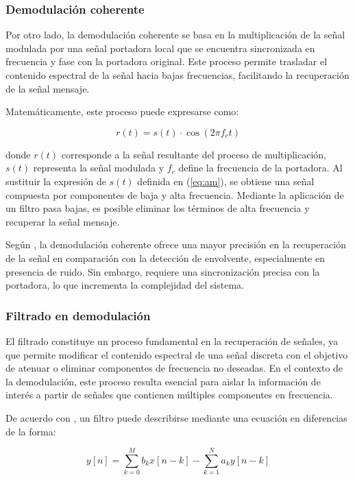 \subsubsection{Demodulación coherente}

Por otro lado, la demodulación coherente se basa en la multiplicación de la señal modulada por una señal portadora local que se encuentra sincronizada en frecuencia y fase con la portadora original. Este proceso permite trasladar el contenido espectral de la señal hacia bajas frecuencias, facilitando la recuperación de la señal mensaje.

Matemáticamente, este proceso puede expresarse como:

\begin{equation}
r(t) = s(t) \cdot \cos(2\pi f_c t)
\end{equation}

donde \( r(t) \) corresponde a la señal resultante del proceso de multiplicación, \( s(t) \) representa la señal modulada y \( f_c \) define la frecuencia de la portadora. Al sustituir la expresión de \( s(t) \) definida en (\ref{eq:am}), se obtiene una señal compuesta por componentes de baja y alta frecuencia. Mediante la aplicación de un filtro pasa bajas, es posible eliminar los términos de alta frecuencia y recuperar la señal mensaje.

Según \cite{proakis2007digital}, la demodulación coherente ofrece una mayor precisión en la recuperación de la señal en comparación con la detección de envolvente, especialmente en presencia de ruido. Sin embargo, requiere una sincronización precisa con la portadora, lo que incrementa la complejidad del sistema.

\subsubsection{Filtrado en demodulación}

El filtrado constituye un proceso fundamental en la recuperación de señales, ya que permite modificar el contenido espectral de una señal discreta con el objetivo de atenuar o eliminar componentes de frecuencia no deseadas. En el contexto de la demodulación, este proceso resulta esencial para aislar la información de interés a partir de señales que contienen múltiples componentes en frecuencia.

De acuerdo con \cite{oppenheim1997}, un filtro puede describirse mediante una ecuación en diferencias de la forma:

\begin{equation}
y[n] = \sum_{k=0}^{M} b_k x[n-k] - \sum_{k=1}^{N} a_k y[n-k]
\end{equation}

